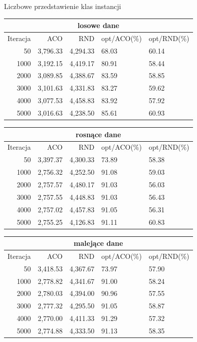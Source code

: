 \documentclass[10pt,a4paper]{article}
\begin{document}
\newpage
\begin{center}
Liczbowe przedstawienie klas instancji
\begin{tabular}{rrrll}
\toprule
\multicolumn{5}{c}{losowe dane}\\
\midrule
Iteracja & ACO & RND  & opt/ACO(\%) & opt/RND(\%) \\
\midrule
50	& 3,796.33	& 4,294.33	& 68.03	& 60.14 \\
1000	& 3,192.15	& 4,419.17	& 80.91	& 58.44 \\
2000	& 3,089.85	& 4,388.67	& 83.59	& 58.85 \\
3000	& 3,101.63	& 4,331.83	& 83.27	& 59.62 \\
4000	& 3,077.53	& 4,458.83	& 83.92	& 57.92 \\
5000	& 3,016.63	& 4,238.50	& 85.61	& 60.93 \\
\bottomrule
\end{tabular}

\begin{tabular}{rrrll}
\toprule
\multicolumn{5}{c}{rosnące dane}\\
\midrule
Iteracja & ACO & RND  & opt/ACO(\%) & opt/RND(\%) \\
\midrule

50	& 3,397.37	& 4,300.33	& 73.89 &	58.38\\
1000	& 2,756.32	& 4,252.50 &	91.08 &	59.03\\
2000	& 2,757.57	& 4,480.17	& 91.03 & 56.03\\
3000	& 2,757.55	& 4,448.83	& 91.03 &	56.43\\
4000	& 2,757.02	& 4,457.83	& 91.05 &	56.31\\
5000	& 2,755.25	& 4,126.83	& 91.11 &	60.83\\
\bottomrule
\end{tabular}

\begin{tabular}{rrrll}
\toprule
\multicolumn{5}{c}{malejące dane}\\
\midrule
Iteracja & ACO & RND  & opt/ACO(\%) & opt/RND(\%) \\
\midrule
50	& 3,418.53	& 4,367.67	& 73.97 &	57.90\\
1000	& 2,778.82	& 4,341.67	& 91.00 &	58.24\\
2000	& 2,780.03	& 4,394.00	& 90.96 & 57.55\\
3000	& 2,777.32	& 4,295.50	& 91.05 &	58.87\\
4000	& 2,770.00	& 4,411.33	& 91.29 &	57.32\\
5000	& 2,774.88	& 4,333.50	& 91.13 &	58.35\\


\end{tabular}
\end{center}
\end{document}
